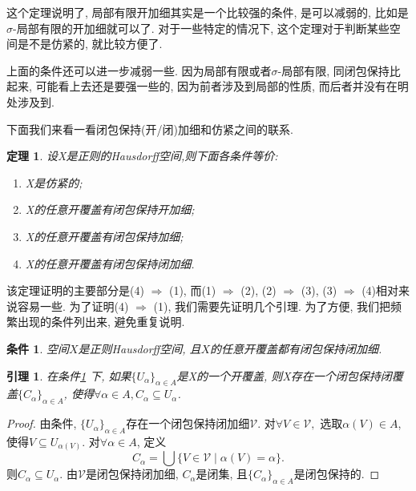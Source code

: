 \documentclass[a4paper,UTF8]{ctexart}
\newtheorem{thm}[theorem]{定理} %
\newtheorem{lemma}[theorem]{引理}
\newtheorem{condition}[theorem]{条件}
\begin{document}
这个定理说明了, 局部有限开加细其实是一个比较强的条件, 是可以减弱的,
比如是$\sigma$-局部有限的开加细就可以了. 对于一些特定的情况下,
这个定理对于判断某些空间是不是仿紧的, 就比较方便了.

上面的条件还可以进一步减弱一些. 因为局部有限或者$\sigma$-局部有限,
同闭包保持比起来, 可能看上去还是要强一些的, 因为前者涉及到局部的性质,
而后者并没有在明处涉及到.

下面我们来看一看闭包保持(开/闭)加细和仿紧之间的联系.

\begin{thm} \label{thm:closure-preserving}
  设X是正则的Hausdorff空间,则下面各条件等价:
  \begin{enumerate}
  \item X是仿紧的;
  \item X的任意开覆盖有闭包保持开加细;
  \item X的任意开覆盖有闭包保持加细;
  \item X的任意开覆盖有闭包保持闭加细.
  \end{enumerate}
\end{thm}

该定理证明的主要部分是(4) $\Rightarrow$ (1), 而(1) $\Rightarrow$ (2),
(2) $\Rightarrow$ (3), (3) $\Rightarrow$ (4)相对来说容易一些.
为了证明(4) $\Rightarrow$ (1), 我们需要先证明几个引理.
为了方便, 我们把频繁出现的条件列出来, 避免重复说明.

\begin{condition} \label{condition:closure-preserving}
  空间$X$是正则Hausdorff空间, 且$X$的任意开覆盖都有闭包保持闭加细.
\end{condition}

\begin{lemma} \label{lemma:indexed closure-preserving}
  在条件\ref{condition:closure-preserving} 下,
  如果$\{ U_{\alpha} \}_{\alpha \in A}$是X的一个开覆盖,
  则X存在一个闭包保持闭覆盖$\{ C_{\alpha} \}_{\alpha \in A}$,
  使得$\forall \alpha \in A, C_{\alpha} \subseteq U_{\alpha}$.
\end{lemma}
\begin{proof}
  由条件, $\{ U_{\alpha} \}_{\alpha \in A}$存在一个闭包保持闭加细$\mathscr{V}$.
  对$\forall V \in \mathscr{V},$ 选取$\alpha(V) \in A$, 使得$V \subseteq U_{\alpha(V)}$.
  对$\forall \alpha \in A$, 定义
  \[
    C_{\alpha} = \bigcup \{ V \in \mathscr{V} \mid \alpha(V) = \alpha \}.
  \]
  则$C_{\alpha} \subseteq U_{\alpha}$. 由$\mathscr{V}$是闭包保持闭加细,
  $C_{\alpha}$是闭集, 且$\{ C_{\alpha} \}_{\alpha \in A}$是闭包保持的.
\end{proof}
\end{document}
